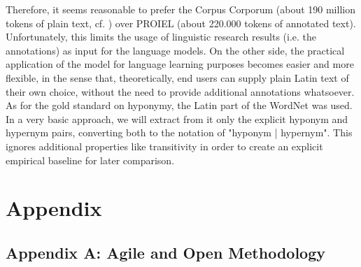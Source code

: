 \documentclass[jou]{apa6} %
\begin{document}
Therefore, it seems reasonable to prefer the Corpus Corporum (about 190 million tokens of plain text, cf. \cite{roelliCorpusCorporumNew2014}) over PROIEL (about 220.000 tokens of annotated text). Unfortunately, this limits the usage of linguistic research results (i.e. the annotations) as input for the language models. On the other side, the practical application of the model for language learning purposes becomes easier and more flexible, in the sense that, theoretically, end users can supply plain Latin text of their own choice, without the need to provide additional annotations whatsoever. As for the gold standard on hyponymy, the Latin part of the WordNet was used. In a very basic approach, we will extract from it only the explicit hyponym and hypernym pairs, converting both to the notation of "hyponym | hypernym". This ignores additional properties like transitivity in order to create an explicit empirical baseline for later comparison. 

\section{Appendix}

\subsection{Appendix A: Agile and Open Methodology}
\label{sec:appendixA}
\end{document}
